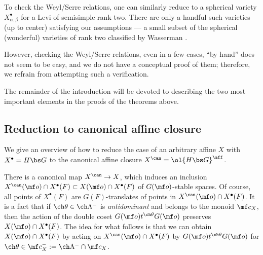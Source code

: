 To check the Weyl/Serre relations, one can similarly reduce to a spherical variety $X^\bullet_{\alpha,\beta}$ for a Levi of semisimple rank two. There are only a handful such varieties (up to center) satisfying our assumptions --- a small subset of the spherical (wonderful) varieties of rank two classified by Wasserman \cite{Wasserman}.


However, checking the Weyl/Serre relations, even in a few cases, ``by hand'' does not seem to be easy, and we do not have a conceptual proof of them; therefore, we refrain from attempting such a verification.

The remainder of the introduction will be devoted to describing the two most important elements in the proofs of the theorems above.


\subsection{Reduction to canonical affine closure}
\label{subsection-reduction-affineclosure}

We give an overview of how to reduce the case of an arbitrary affine $X$ with
$X^\bullet=H\bs G$ to the
canonical affine closure $X^\can = \ol{H\bs G}^\aff$.

There is a canonical map $X^\can \to X$, which induces an inclusion
$X^\can(\mf o) \cap X^\bullet(F) \subset X(\mf o)\cap X^\bullet(F)$ of
$G(\mf o)$-stable spaces.
Of course, all points of $X^\bullet(F)$ are $G(F)$-translates of points in $X^\can(\mf o)\cap X^\bullet(F)$.
It is a fact that if $\ch\theta \in \ch\Lambda^-$ is \emph{antidominant}
and belongs to the monoid $\mf c_X$, then
the action of the double coset $G(\mf o) t^{\ch\theta} G(\mf o)$ preserves $X(\mf o)\cap X^\bullet(F)$.
The idea for what follows is that we can obtain
$X(\mf o)\cap X^\bullet(F)$ by acting on $X^\can(\mf o)\cap X^\bullet(F)$ by $G(\mf o) t^{\ch\theta} G(\mf o)$
for $\ch\theta \in \mf c_X^- := \ch\Lambda^- \cap \mf c_X$.

